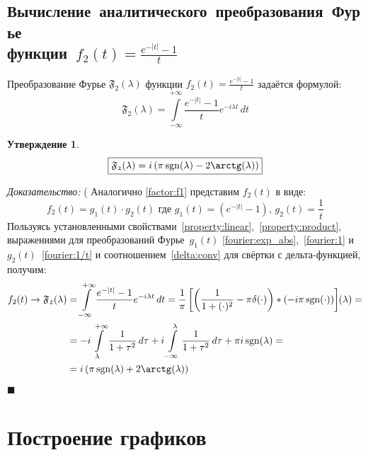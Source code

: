 \documentclass[11pt, oneside, final]{article}
\numberwithin{equation}{section}
\newtheorem*{statement}{Утверждение}
\renewenvironment{proof}{
\noindent\textit{Доказательство: }} {\qed}
\newcommand \rarrow{\rightarrow}
\newcommand \intinf[1][{\,dt}]{ \int\limits_{-\infty}^{+\infty}{{#1}}}
\renewcommand \qed{$\blacksquare$}
\DeclareMathOperator{\sgn}{sgn}
\begin{document}
    \subsection{Вычисление~аналитического~преобразования~Фурье\\функции~\(f_2(t) = \frac{e^{-|t|} - 1}{t} \)}
    Преобразование Фурье \( \mathfrak{F_2} (\lambda)\) функции \(f_2(t) = \frac{e^{-|t|} - 1}{t} \) задаётся формулой:
    \[ \mathfrak{F_2} (\lambda) = \intinf[{\dfrac{e^{-|t|} - 1}{t} e^{-i\lambda t}\, dt}] \]
    \begin{statement}
        \begin{equation}\label{eq:fourier:f2} 
            \boxed{ \mathfrak{F_2}(\lambda) = i\left(\pi\sgn(\lambda) - 2\arctg(\lambda)\right) } 
        \end{equation}
    \end{statement}
    \begin{proof}(
        Аналогично \eqref{factor:f1} представим \(f_2(t) \) в виде: 
        \begin{equation}\label{factor:f2} 
            f_2(t) = g_1(t) \cdot g_2(t) \text{ где } g_1(t) = \left(e^{-|t|} - 1\right)\text{, } g_2(t) = \dfrac{1}{t} 
        \end{equation}
        Пользуясь установленными свойствами~\ref{property:linear},~\ref{property:product}, выражениями для преобразований Фурье~\(g_1(t)\) \eqref{fourier:exp_abs},~\eqref{fourier:1} и~\(g_2(t)\)~\eqref{fourier:1/t} и соотношением~\eqref{delta:conv} для свёртки с дельта-функцией, получим:
        \[ 
        \begin{split} 
            f_2(t) \rarrow \mathfrak{F_2} (\lambda) &= \intinf[{ \dfrac{e^{-|t|} - 1}{t} e^{-i\lambda t}\, dt}] = \dfrac{1}{\pi}\left[\left({\dfrac{1}{1 + (\cdot)^2} - \pi\delta(\cdot)}\right) * \left({-i \pi \sgn(\cdot)}\right)\right] \negmedspace({\lambda}) = \\
            &= -i\int\limits_{\lambda}^{+\infty}{\dfrac{1}{1 + \tau^2}\, d\tau} + i\int\limits_{-\infty}^{\lambda}{\dfrac{1}{1 + \tau^2}\, d\tau} + \pi i \sgn(\lambda) = \\
            &= i\left(\pi \sgn(\lambda) + 2\arctg(\lambda)\right) 
        \end{split}
        \]
    \end{proof}
    \clearpage
    \section{Построение графиков} %
    \label{sec:plotting}
\end{document}

